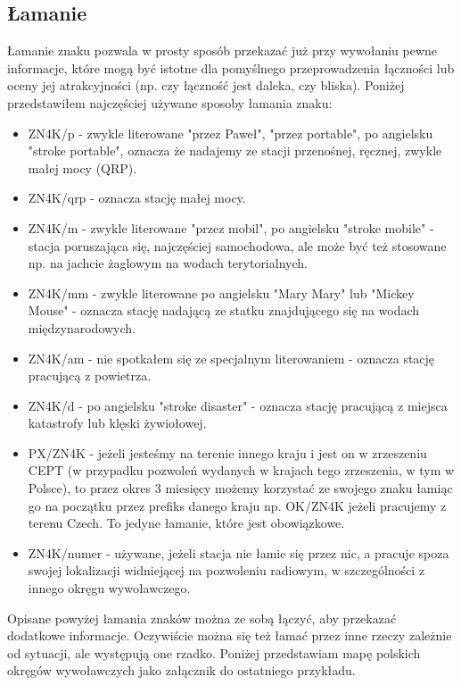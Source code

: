 \documentclass[a4paper,11pt]{article}
\begin{document}
\subsection{Łamanie}
Łamanie znaku pozwala w prosty sposób przekazać już przy wywołaniu pewne informacje, które mogą być istotne dla pomyślnego przeprowadzenia łączności lub oceny jej atrakcyjności (np. czy łączność jest daleka, czy bliska). Poniżej przedstawiłem najczęściej używane sposoby łamania znaku:
\begin{itemize}
\item ZN4K/p - zwykle literowane "przez Paweł", "przez portable", po angielsku "stroke portable", oznacza że nadajemy ze stacji przenośnej, ręcznej, zwykle małej mocy (QRP).
\item ZN4K/qrp - oznacza stację małej mocy.
\item ZN4K/m - zwykle literowane "przez mobil", po angielsku "stroke mobile" - stacja poruszająca się, najczęściej samochodowa, ale może być też stosowane np. na jachcie żaglowym na wodach terytorialnych.
\item ZN4K/mm - zwykle literowane po angielsku "Mary Mary" lub "Mickey Mouse" - oznacza stację nadającą ze statku znajdującego się na wodach międzynarodowych.
\item ZN4K/am - nie spotkałem się ze specjalnym literowaniem - oznacza stację pracującą z powietrza.
\item ZN4K/d - po angielsku "stroke disaster" - oznacza stację pracującą z miejsca katastrofy lub klęski żywiołowej.
\item PX/ZN4K - jeżeli jesteśmy na terenie innego kraju i jest on w zrzeszeniu CEPT (w przypadku pozwoleń wydanych w krajach tego zrzeszenia, w tym w Polsce), to przez okres 3 miesięcy możemy korzystać ze swojego znaku łamiąc go na początku przez prefiks danego kraju np. OK/ZN4K jeżeli pracujemy z terenu Czech. To jedyne łamanie, które jest obowiązkowe.
\item ZN4K/numer - używane, jeżeli stacja nie łamie się przez nic, a pracuje spoza swojej lokalizacji widniejącej na pozwoleniu radiowym, w szczególności z innego okręgu wywoławczego.
\end{itemize}
Opisane powyżej łamania znaków można ze sobą łączyć, aby przekazać dodatkowe informacje. Oczywiście można się też łamać przez inne rzeczy zależnie od sytuacji, ale występują one rzadko. Poniżej przedstawiam mapę polskich okręgów wywoławczych jako załącznik do ostatniego przykładu.
\end{document}
